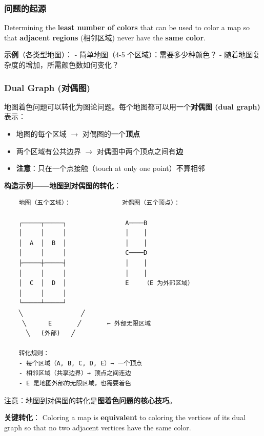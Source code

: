 \documentclass[10pt,a4paper,openany]{ctexbook}
\theoremstyle{definition}
\theoremstyle{remark}
\renewenvironment{quote}
  {\list{}{\leftmargin=1em\rightmargin=0pt\topsep=0.5pt\partopsep=0pt}\item[]}
  {\endlist}
\begin{document}
\subsubsection{问题的起源}

\begin{quote}
Determining the \textbf{least number of colors} that can be used to color a map so that \textbf{adjacent regions} (相邻区域) never have the \textbf{same color}.

\textbf{示例}（各类型地图）：
- 简单地图（4-5 个区域）：需要多少种颜色？
- 随着地图复杂度的增加，所需颜色数如何变化？

\end{quote}
\vspace{-2pt}

\subsubsection{Dual Graph (对偶图)}

地图着色问题可以转化为图论问题。每个地图都可以用一个\textbf{对偶图 (dual graph)} 表示：
\begin{itemize}
\item 地图的每个区域 $\rightarrow$ 对偶图的一个\textbf{顶点}
\item 两个区域有公共边界 $\rightarrow$ 对偶图中两个顶点之间有\textbf{边}
\item \textbf{注意}：只在一个点接触（touch at only one point）不算相邻

\end{itemize}

\textbf{构造示例——地图到对偶图的转化}：
{\footnotesize\begin{verbatim}
    地图（五个区域）：              对偶图（五个顶点）：
                                    
    ┌─────┬─────┐                A────B
    │     │     │                │    │
    │  A  │  B  │                │    │
    │     │     │                C────D
    ├─────┼─────┤                │    │
    │     │     │                │    │
    │  C  │  D  │                E    （E 为外部区域）
    │     │     │
    └─────┴─────┘
    ╲                ╱
     ╲      E       ╱       ← 外部无限区域
      ╲   (外部)   ╱

    转化规则：
    - 每个区域（A, B, C, D, E）→ 一个顶点
    - 相邻区域（共享边界）→ 顶点之间连边
    - E 是地图外部的无限区域，也需要着色
\end{verbatim}}

\begin{quote}
注意：地图到对偶图的转化是\textbf{图着色问题的核心技巧}。

\textbf{关键转化}：
Coloring a map is \textbf{equivalent} to coloring the vertices of its dual graph so that no two adjacent vertices have the same color.

\end{quote}
\vspace{-2pt}
\end{document}
